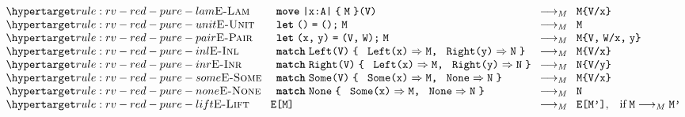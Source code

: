 \begin{figure*}
  \begin{mdframed}\begin{highlight}
    \centering
    \[\!\!%
      \setlength{\arraycolsep}{4pt}%
      \begin{array}{llcl}
        \rlabel{\textsc{E-Lam}}{rule:rv-red-pure-lam}
        & {\rvApp{\rvAbs[A]{x}{M}}{V}}
        & \rvRedArrPure
        & {\rvSub{M}{x}{V}}
        \\
        \rlabel{\textsc{E-Unit}}{rule:rv-red-pure-unit}
        & {\rvLetUnit{\rvUnit}{M}}
        & \rvRedArrPure
        & {\rvTm{M}}
        \\
        \rlabel{\textsc{E-Pair}}{rule:rv-red-pure-pair}
        & {\rvLetPair{x}{y}{\rvPair{V}{W}}{M}}
        & \rvRedArrPure
        & {\rvSub{M}{\tm{x}\st{,}\;\tm{y}}{\tm{V}\st{,}\;\tm{W}}}
        \\
        \rlabel{\textsc{E-Inl}}{rule:rv-red-pure-inl}
        & {\rvCaseSum{\rvInl{V}}{x}{M}{y}{N}}
        & \rvRedArrPure
        & {\rvSub{M}{x}{V}}
        \\
        \rlabel{\textsc{E-Inr}}{rule:rv-red-pure-inr}
        & {\rvCaseSum{\rvInr{V}}{x}{M}{y}{N}}
        & \rvRedArrPure
        & {\rvSub{N}{y}{V}}
        \\
        \rlabel{\textsc{E-Some}}{rule:rv-red-pure-some}
        & {\rvCaseOpt{\rvSome{V}}{x}{M}{N}}
        & \rvRedArrPure
        & {\rvSub{M}{x}{V}}
        \\
        \rlabel{\textsc{E-None}}{rule:rv-red-pure-none}
        & {\rvCaseOpt{\rvNone}{x}{M}{N}}
        & \rvRedArrPure
        & {\rvTm{N}}
        \\
        \rlabel{\textsc{E-Lift}}{rule:rv-red-pure-lift}
        & {\rvPlug{E}{M}}
        & \rvRedArrPure
        & {\rvPlug{E}{M'}}\st{,}
          \quad\text{if}\;\rvRedPure{M}{M'}
      \end{array}
    \]

    \begin{center}
      \begin{prooftree*}
      \end{prooftree*}


\end{center}
\end{highlight}
\end{mdframed}
\end{figure*}
